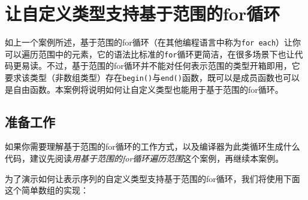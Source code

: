 
\section{让自定义类型支持基于范围的for循环}



如上一个案例所述，基于范围的for循环（在其他编程语言中称为\texttt{for each}）让你可以遍历范围中的元素，它的语法比标准的\texttt{for}循环更简洁，在很多场景下也让代码更易读。不过，基于范围的for循环并不能对任何表示范围的类型开箱即用，它要求该类型（非数组类型）存在\texttt{begin()}与\texttt{end()}函数，既可以是成员函数也可以是自由函数。本案例将说明如何让自定义类型也能用于基于范围的for循环。



\subsection{准备工作}



如果你需要理解基于范围的for循环的工作方式，以及编译器为此类循环生成什么代码，建议先阅读\textit{用基于范围的for循环遍历范围}这个案例，再继续本案例。



为了演示如何让表示序列的自定义类型支持基于范围的for循环，我们将使用下面这个简单数组的实现：



